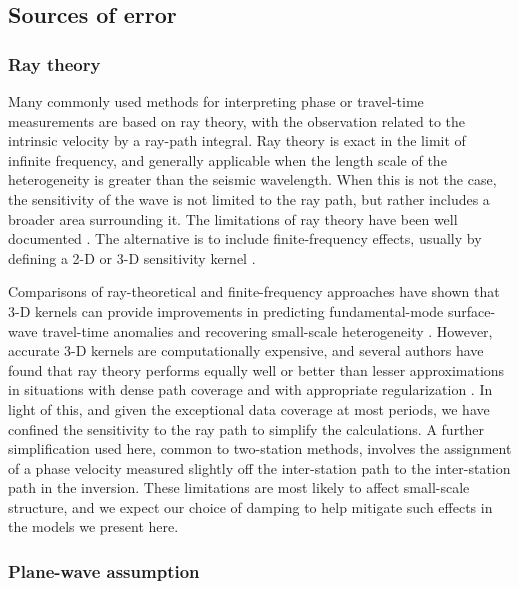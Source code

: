 \documentclass[12pt,oneside]{book}
\begin{document}
\subsection{Sources of error} \label{sec:errordiscussion}

\subsubsection*{R\lowercase{ay} \lowercase{theory}}

Many commonly used methods for interpreting phase or travel-time measurements are based on ray theory, with the observation related to the intrinsic velocity by a ray-path integral. Ray theory is exact in the limit of infinite frequency, and generally applicable when the length scale of the heterogeneity is greater than the seismic wavelength.  When this is not the case, the sensitivity of the wave is not limited to the ray path, but rather includes a broader area surrounding it. The limitations of ray theory have been well documented \citep[e.g.,][]{Woodhouse&Girnius1982, Spetzleretal2002, Boschi2006}. The alternative is to include finite-frequency effects, usually by defining a 2\nobreakdash-D or 3\nobreakdash-D sensitivity kernel \citep[e.g.,][]{Meieretal1997, Yoshizawa&Kennett2002, Yoshizawa&Kennett2005, Zhouetal2004, Tromp2005, Peteretal2007, LinRitzwoller2010}.  

Comparisons of ray-theoretical and finite-frequency approaches have shown that 3\nobreakdash-D kernels can provide improvements in predicting fundamental-mode surface-wave travel-time anomalies and recovering small-scale heterogeneity \citep[e.g.,][]{Zhou2005, Peteretal2009}. However, accurate 3-D kernels are computationally expensive, and several authors have found that ray theory performs equally well or better than lesser approximations in situations with dense path coverage and with appropriate regularization \citep[e.g.,][]{Spetzleretal2002, Sieminski2004, Boschi2006, Trampert&Spetzler2006}. In light of this, and given the exceptional data coverage at most periods, we have confined the sensitivity to the ray path to simplify the calculations. A further simplification used here, common to two-station methods, involves the assignment of a phase velocity measured slightly off the inter-station path to the
inter-station path in the inversion. These limitations are most likely to affect small-scale structure, and we expect our choice of damping to help mitigate such effects in the models we present here. 

\subsubsection*{Plane-wave assumption}
\end{document}
